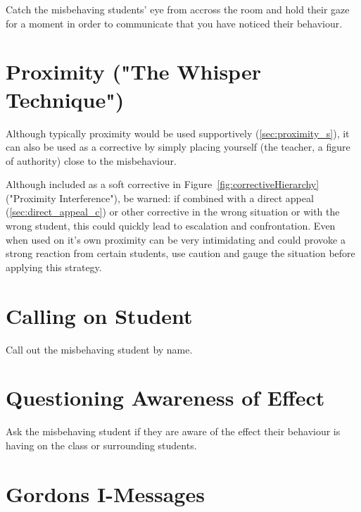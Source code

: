 \documentclass[12pt]{report}
\begin{document}
Catch the misbehaving students' eye from accross the room and hold their gaze for a moment in order to communicate that you have noticed their behaviour\footnotemark. 



\section{Proximity ("The Whisper Technique")}
\label{sec:proximity_c}

Although typically proximity would be used supportively (\ref{sec:proximity_s}), it can also be used as a corrective by simply placing yourself (the teacher, a figure of authority) close to the misbehaviour\footnotemark[\value{footnote}].

Although included as a soft corrective in Figure~\ref{fig:correctiveHierarchy} ("Proximity Interference"), be warned: if combined with a direct appeal (\ref{sec:direct_appeal_c}) or other corrective in the wrong situation or with the wrong student, this could quickly lead to escalation and confrontation. Even when used on it's own proximity can be very intimidating and could provoke a strong reaction from certain students, use caution and gauge the situation before applying this strategy.



\section{Calling on Student}
\label{sec:use_names_c}

Call out the misbehaving student by name\footnotemark[\value{footnote}].






\section{Questioning Awareness of Effect}
\label{sec:questioning_c}

Ask the misbehaving student if they are aware of the effect their behaviour is having on the class or surrounding students.



\section{Gordons I-Messages}
\label{sec:i_messages_c}
\end{document}
